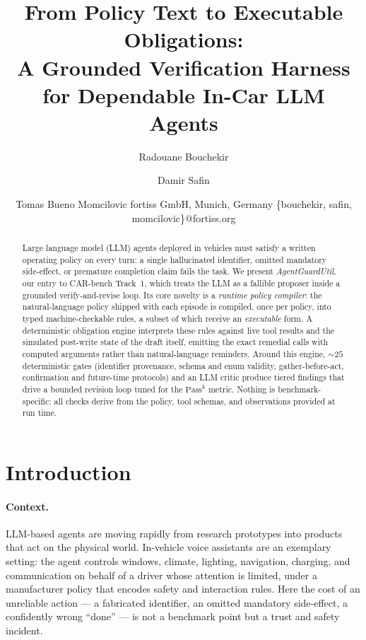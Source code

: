 \documentclass{article}
\title{From Policy Text to Executable Obligations:\\
A Grounded Verification Harness for Dependable In-Car LLM Agents}
\author{
Radouane Bouchekir
\and
Damir Safin
\and
Tomas Bueno Momcilovic
\affiliations
fortiss GmbH, Munich, Germany
\emails
\{bouchekir, safin, momcilovic\}@fortiss.org
}
\newcommand{\pass}[1]{\ensuremath{\mathrm{Pass}^{#1}}}
\begin{document}
\maketitle

\begin{abstract}
Large language model (LLM) agents deployed in vehicles must satisfy a written
operating policy on every turn: a single hallucinated identifier, omitted
mandatory side-effect, or premature completion claim fails the task. We present
\emph{AgentGuardUtil}, our entry to CAR-bench Track~1, which treats the LLM as
a fallible proposer inside a grounded verify-and-revise loop. Its core novelty
is a \emph{runtime policy compiler}: the natural-language policy shipped with
each episode is compiled, once per policy, into typed machine-checkable rules,
a subset of which receive an \emph{executable} form. A deterministic obligation
engine interprets these rules against live tool results and the simulated
post-write state of the draft itself, emitting the exact remedial calls with
computed arguments rather than natural-language reminders. Around this engine,
${\sim}25$ deterministic gates (identifier provenance, schema and enum
validity, gather-before-act, confirmation and future-time protocols) and an LLM
critic produce tiered findings that drive a bounded revision loop tuned for the
$\pass{k}$ metric. Nothing is benchmark-specific: all checks derive from the
policy, tool schemas, and observations provided at run time.
\end{abstract}

\section{Introduction}
\paragraph{Context.}
LLM-based agents are moving rapidly from research prototypes into products
that act on the physical world. In-vehicle voice assistants are an exemplary
setting: the agent controls windows, climate, lighting, navigation, charging,
and communication on behalf of a driver whose attention is limited, under a
manufacturer policy that encodes safety and interaction rules. Here the cost
of an unreliable action --- a fabricated identifier, an omitted mandatory
side-effect, a confidently wrong ``done'' --- is not a benchmark point but a
trust and safety incident.
\end{document}
